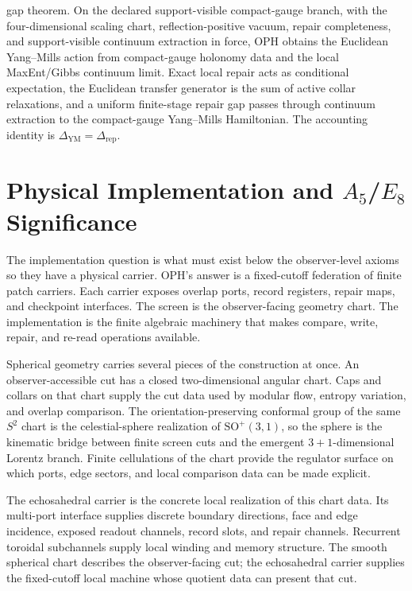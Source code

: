 \documentclass[11pt]{article}
\begin{document}
\begin{enumerate}[leftmargin=2em]
{gap theorem.} On the declared support-visible compact-gauge branch, with the four-dimensional
scaling chart, reflection-positive vacuum, repair completeness, and support-visible continuum
extraction in force, OPH obtains the Euclidean Yang--Mills action from compact-gauge holonomy
data and the local MaxEnt/Gibbs continuum limit.
Exact local repair acts as conditional expectation, the Euclidean transfer generator is the
sum of active collar relaxations, and a uniform finite-stage repair gap passes through continuum
extraction to the compact-gauge Yang--Mills Hamiltonian. The accounting identity is
\(\Delta_{\mathrm{YM}}=\Delta_{\mathrm{rep}}\).
\end{enumerate}

\section{Physical Implementation and \(A_5\)/\(E_8\) Significance}

The implementation question is what must exist below the observer-level axioms so they have a
physical carrier. OPH's answer is a fixed-cutoff federation of finite patch carriers. Each carrier
exposes overlap ports, record registers, repair maps, and checkpoint interfaces. The screen is the
observer-facing geometry chart. The implementation is the finite algebraic machinery that makes
compare, write, repair, and re-read operations available.

Spherical geometry carries several pieces of the construction at once. An observer-accessible cut
has a closed two-dimensional angular chart. Caps and collars on that chart supply the cut data used
by modular flow, entropy variation, and overlap comparison. The orientation-preserving conformal
group of the same \(S^2\) chart is the celestial-sphere realization of
\(\mathrm{SO}^+(3,1)\), so the sphere is the kinematic bridge between finite screen cuts and the
emergent \(3+1\)-dimensional Lorentz branch. Finite cellulations of the chart provide the
regulator surface on which ports, edge sectors, and local comparison data can be made explicit.

The echosahedral carrier is the concrete local realization of this chart data. Its multi-port
interface supplies discrete boundary directions, face and edge incidence, exposed readout
channels, record slots, and repair channels. Recurrent toroidal subchannels supply local winding
and memory structure. The smooth spherical chart describes the observer-facing cut; the
echosahedral carrier supplies the fixed-cutoff local machine whose quotient data can present that
cut.
\end{document}
